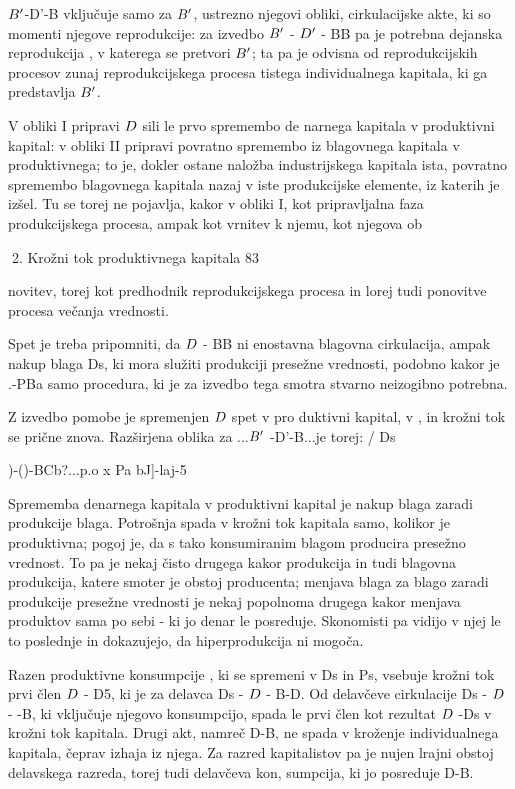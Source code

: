 \documentclass[kapital_02.tex]{subfiles}
\begin{document}
\( B' \)-D'-B vključuje samo za \( B' \), ustrezno njegovi obliki, cirkulacijske akte, ki so momenti njegove reprodukcije: za izvedbo \( B' \) - \( D' \) - BB pa je potrebna dejanska reprodukcija \KPEB, v katerega se pretvori \( B' \); ta pa je odvisna od reprodukcijskih procesov zunaj reprodukcijskega procesa tistega individualnega kapitala, ki ga predstavlja \( B' \).

V obliki I pripravi \( D \) sili le prvo spremembo de narnega kapitala v produktivni kapital: v obliki II pripravi povratno spremembo iz blagovnega kapitala v produktivnega; to je, dokler ostane naložba industrijskega kapitala ista, povratno spremembo blagovnega kapitala nazaj v iste produkcijske elemente, iz katerih je izšel. Tu se torej ne pojavlja, kakor v obliki I, kot pripravljalna faza produkcijskega procesa, ampak kot vrnitev k njemu, kot njegova ob





2. Krožni tok produktivnega kapitala 83



 novitev, torej kot predhodnik reprodukcijskega procesa in lorej tudi ponovitve procesa večanja vrednosti.

Spet je treba pripomniti, da \( D \) - BB ni enostavna blagovna cirkulacija, ampak nakup blaga Ds, ki mora služiti produkciji presežne vrednosti, podobno kakor je \KPED.-PBa samo procedura, ki je za izvedbo tega smotra stvarno neizogibno potrebna.

Z izvedbo pomobe je spremenjen \( D \) spet v pro duktivni kapital, v \KPEP, in krožni tok se prične znova. Razširjena oblika za \KPEP...\( B' \) -D'-B...\KPEP je torej: / Ds

\KPEB)-(\KPED)-BCb?...\KPEP p.o x Pa bJ]-laj-5

Sprememba denarnega kapitala v produktivni kapital je nakup blaga zaradi produkcije blaga. Potrošnja spada v krožni tok kapitala samo, kolikor je produktivna; pogoj je, da s tako konsumiranim blagom producira presežno vrednost. To pa je nekaj čisto drugega kakor produkcija in tudi blagovna produkcija, katere smoter je obstoj producenta; menjava blaga za blago zaradi produkcije presežne vrednosti je nekaj popolnoma drugega kakor menjava produktov sama po sebi - ki jo denar le posreduje. Skonomisti pa vidijo v njej le to poslednje in dokazujejo, da hiperprodukcija ni mogoča.

Razen produktivne konsumpcije \KPED, ki se spremeni v Ds in Ps, vsebuje krožni tok prvi člen \( D \) - D5, ki je za delavca Ds - \( D \) - B-D. Od delavčeve cirkulacije Ds - \( D \) - -B, ki vključuje njegovo konsumpcijo, spada le prvi člen kot rezultat \( D \) -Ds v krožni tok kapitala. Drugi akt, namreč D-B, ne spada v kroženje individualnega kapitala, čeprav izhaja iz njega. Za razred kapitalistov pa je nujen lrajni obstoj delavskega razreda, torej tudi delavčeva kon, sumpcija, ki jo posreduje D-B.
\end{document}
